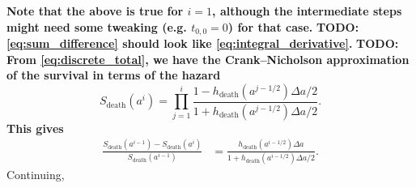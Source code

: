 \documentclass[12pt]{article}
\begin{document}
%
\textbf{Note that the above is true for $i = 1$,
  although the intermediate steps might need some tweaking
  (e.g. $t_{0, 0} = 0$) for that case.}
%
\textbf{TODO: \eqref{eq:sum_difference} should look like
  \eqref{eq:integral_derivative}.}
%
\textbf{TODO: From \eqref{eq:discrete_total}, we have the
  Crank--Nicholson approximation of the survival in terms of the
  hazard}
\begin{displaymath}
  S_{\text{death}}(a^i)
  = \prod_{j = 1}^i \frac{
    1 - h_{\text{death}}(a^{j - 1 / 2}) \Delta a / 2
  }{
    1 + h_{\text{death}}(a^{j - 1 / 2}) \Delta a / 2
  }.
\end{displaymath}
\textbf{This gives}
\begin{displaymath}
  \begin{split}
    \frac{
      S_{\text{death}}(a^{i - 1}) - S_{\text{death}}(a^i)
    }{
      S_{\text{death}}(a^{i - 1})
    }
    &= \frac{
      h_{\text{death}}(a^{i - 1 / 2}) \Delta a
    }{
      1 + h_{\text{death}}(a^{i - 1 / 2}) \Delta a / 2
    }.
  \end{split}
\end{displaymath}
%
Continuing,
\end{document}

